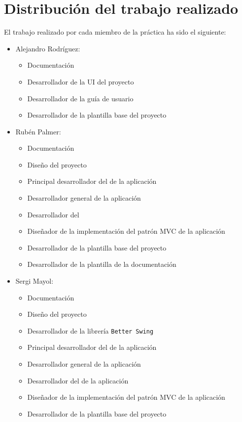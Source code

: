 \section{Distribución del trabajo realizado}

El trabajo realizado por cada miembro de la práctica ha sido el siguiente: \bigskip

\begin{itemize}
    \item Alejandro Rodríguez:
    \begin{itemize}
        \item Documentación
        \item Desarrollador de la UI del proyecto
        \item Desarrollador de la guía de usuario
        \item Desarrollador de la plantilla base del proyecto
    \end{itemize}
    
    \item Rubén Palmer:
    \begin{itemize}
        \item Documentación
        \item Diseño del proyecto
        \item Principal desarrollador del  de la aplicación
        \item Desarrollador general de la aplicación
        \item Desarrollador del 
        \item Diseñador de la implementación del patrón MVC de la aplicación
        \item Desarrollador de la plantilla base del proyecto
        \item Desarrollador de la plantilla de la documentación 
    \end{itemize}
    \item Sergi Mayol:
    \begin{itemize}
        \item Documentación
        \item Diseño del proyecto
        \item Desarrollador de la librería \texttt{Better Swing}
        \item Principal desarrollador del  de la aplicación
        \item Desarrollador general de la aplicación
        \item Desarrollador del  de la aplicación
        \item Diseñador de la implementación del patrón MVC de la aplicación
        \item Desarrollador de la plantilla base del proyecto
    \end{itemize}
\end{itemize}

